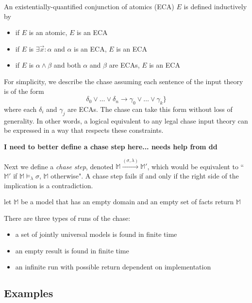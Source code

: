 		An existentially-quantified conjunction of atomics (ECA) $E$ is defined
		inductively by
		\begin{itemize}
		\item if $E$ is an atomic, $E$ is an ECA
		\item if $E$ is $\exists \vec{x} : \alpha$ and $\alpha$ is an ECA, $E$ is an ECA
		\item if $E$ is $\alpha \wedge \beta$ and both $\alpha$ and $\beta$ are ECAs, $E$ is an ECA
		\end{itemize}
		For simplicity, we describe the chase assuming each sentence of the
		input theory is of the form
		\[\delta_0 \vee\ldots\vee \delta_n \to \gamma_0 \vee\ldots\vee \gamma_k\}\]
		where each $\delta_i$ and $\gamma_j$ are ECAs.  The chase can take this
		form without loss of generality. In other words, a logical equivalent
		to any legal chase input theory can be expressed in a way that respects
		these constraints.

		\textbf{I need to better define a chase step here... needs help from dd}

		Next we define a \emph{chase step}, denoted $\mathbb{M}
		\xrightarrow{(\sigma,\lambda)} \mathbb{M}'$, which would be equivalent
		to ``$\mathbb{M}'$ if $\mathbb{M} \models_\lambda \sigma$, $\mathbb{M}$
		otherwise". A chase step fails if and only if the right side of the
		implication is a contradiction.

		\begin{algorithm}[H]
		\DontPrintSemicolon
		let $\mathbb{M}$ be a model that has an empty domain and an empty set of facts \;
		return $\mathbb{M}$
		\end{algorithm}

		There are three types of runs of the chase:
		\begin{itemize}
		\item a set of jointly universal models is found in finite time
		\item an empty result is found in finite time
		\item an infinite run with possible return dependent on implementation
		\end{itemize}

	\subsection{Examples}

